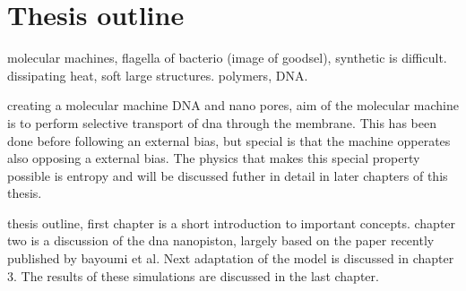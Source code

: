 \section{Thesis outline}

molecular machines, flagella of bacterio (image of goodsel), synthetic is difficult.
dissipating heat, soft large structures.  polymers, DNA.

creating a molecular machine DNA and nano pores, aim of the molecular machine is to
perform selective transport of dna through the membrane. This has been done before
following an external bias, but special is that the machine opperates also opposing a
external bias. The physics that makes this special property possible is entropy and will
be discussed futher in detail in later chapters of this thesis.

thesis outline, first chapter is a short introduction to important concepts. chapter two
is a discussion of the dna nanopiston, largely based on the paper recently published by
bayoumi et al. Next adaptation of the model is discussed in chapter 3. The results of
these simulations are discussed in the last chapter.
